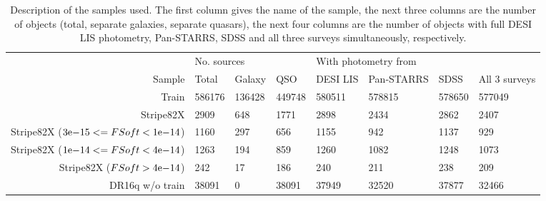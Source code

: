 \documentclass[fleqn,usenatbib]{mnras}
\begin{document}
\begin{table}
	\begin{tabular}{rlllllll}
            \hline
            {} & \multicolumn{3}{l}{No. sources} & \multicolumn{4}{l}{With photometry from} \\
            Sample &       Total &  Galaxy &     QSO &             DESI LIS & Pan-STARRS &    SDSS & All 3 surveys \\
            \hline
            Train                                                          &      586176 &  136428 &  449748 &               580511 &     578815 &  578650 &        577049 \\
            Stripe82X                                                      &        2909 &     648 &    1771 &                 2898 &       2434 &    2862 &          2407 \\
            Stripe82X (${3}\mathrm{e}{-15} <= FSoft < {1}\mathrm{e}{-14}$) &        1160 &     297 &     656 &                 1155 &        942 &    1137 &           929 \\
            Stripe82X (${1}\mathrm{e}{-14} <= FSoft < {4}\mathrm{e}{-14}$) &        1263 &     194 &     859 &                 1260 &       1082 &    1248 &          1073 \\
            Stripe82X ($FSoft > {4}\mathrm{e}{-14}$)                       &         242 &      17 &     186 &                  240 &        211 &     238 &           209 \\
            DR16q w/o train                                                &       38091 &       0 &   38091 &                37949 &      32520 &   37877 &         32466 \\
            \hline
            \end{tabular}
            \label{tab:samples}
            \caption{Description of the samples used. The first column gives the name of the sample, the next three columns are the number of objects (total, separate galaxies, separate quasars), the next four columns are the number of objects with full DESI LIS photometry, Pan-STARRS, SDSS and all three surveys simultaneously, respectively.}
\end{table}
\end{document}
